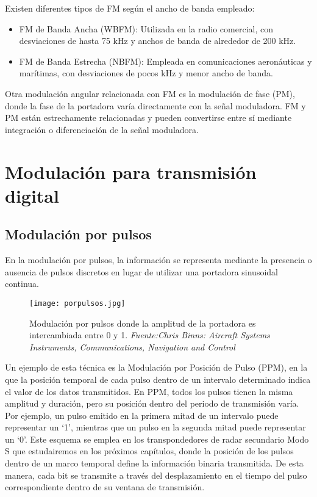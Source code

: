 Existen diferentes tipos de FM según el ancho de banda empleado:
\begin{itemize}
\item FM de Banda Ancha (WBFM): Utilizada en la radio comercial, con desviaciones de hasta 75 kHz y anchos de banda de alrededor de 200 kHz.
\item FM de Banda Estrecha (NBFM): Empleada en comunicaciones aeronáuticas y marítimas, con desviaciones de pocos kHz y menor ancho de banda.\\
\end{itemize}

Otra modulación angular relacionada con FM es la modulación de fase (PM), donde la fase de la portadora varía directamente con la señal moduladora. FM y PM están estrechamente relacionadas y pueden convertirse entre sí mediante integración o diferenciación de la señal moduladora.\\

\section{Modulación para transmisión digital}
\subsection{Modulación por pulsos}

En la modulación por pulsos, la información se representa mediante la presencia o ausencia de pulsos discretos en lugar de utilizar una portadora sinusoidal continua.

\begin{figure}[H]
    \centering
    \texttt{[image: porpulsos.jpg]}
    \caption{\centering Modulación por pulsos donde la amplitud de la portadora es intercambiada entre 0 y 1. \textit{ Fuente:Chris Binns: Aircraft Systems Instruments, Communications, Navigation and Control}}
    \label{fig:porpulsos}
\end{figure}

Un ejemplo de esta técnica es la Modulación por Posición de Pulso (PPM), en la que la posición temporal de cada pulso dentro de un intervalo determinado indica el valor de los datos transmitidos. En PPM, todos los pulsos tienen la misma amplitud y duración, pero su posición dentro del periodo de transmisión varía. Por ejemplo, un pulso emitido en la primera mitad de un intervalo puede representar un ‘1’, mientras que un pulso en la segunda mitad puede representar un ‘0’. Este esquema se emplea en los transpondedores de radar secundario Modo S que estudairemos en los próximos capítulos, donde la posición de los pulsos dentro de un marco temporal define la información binaria transmitida. De esta manera, cada bit se transmite a través del desplazamiento en el tiempo del pulso correspondiente dentro de su ventana de transmisión.

